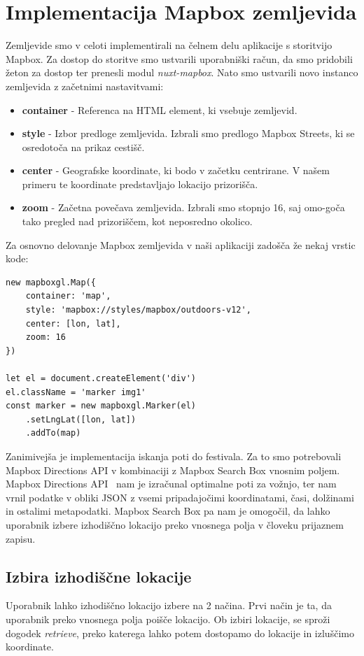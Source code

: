 \documentclass[a4paper,12pt,openright]{book}
\begin{document}
\section{Implementacija Mapbox zemljevida}
Zemljevide smo v celoti implementirali na čelnem delu aplikacije s storitvijo Mapbox.
Za dostop do storitve smo ustvarili uporabniški račun, da smo pridobili žeton za dostop ter prenesli modul \textit{nuxt-mapbox}.
Nato smo ustvarili novo instanco zemljevida z začetnimi nastavitvami:
\begin{itemize}
    \item \textbf{container} - Referenca na HTML element, ki vsebuje zemljevid.
    \item \textbf{style} - Izbor predloge zemljevida. Izbrali smo predlogo Mapbox Streets, ki se osredotoča na prikaz cestišč.
    \item \textbf{center} - Geografske koordinate, ki bodo v začetku centrirane. V našem primeru te koordinate predstavljajo lokacijo prizorišča.
    \item \textbf{zoom} - Začetna povečava zemljevida. Izbrali smo stopnjo 16, saj omo-goča tako pregled nad prizoriščem, kot neposredno okolico.
\end{itemize}

Za osnovno delovanje Mapbox zemljevida v naši aplikaciji zadošča že nekaj vrstic kode:
\begin{lstlisting}[label=code4,caption=Primer kode za prikaz lokacije na Mapbox zemljevidu.,frame=tb,captionpos=b]
new mapboxgl.Map({
    container: 'map',
    style: 'mapbox://styles/mapbox/outdoors-v12',
    center: [lon, lat],
    zoom: 16
})

let el = document.createElement('div')
el.className = 'marker img1'
const marker = new mapboxgl.Marker(el)
    .setLngLat([lon, lat])
    .addTo(map)
\end{lstlisting}

Zanimivejša je implementacija iskanja poti do festivala.
Za to smo potrebovali Mapbox Directions API v kombinaciji z Mapbox Search Box vnosnim poljem.
Mapbox Directions API~\cite{mapboxdirections} nam je izračunal optimalne poti za vožnjo, ter nam vrnil podatke v obliki JSON z vsemi pripadajočimi koordinatami, časi, dolžinami in ostalimi metapodatki.
Mapbox Search Box pa nam je omogočil, da lahko uporabnik izbere izhodiščno lokacijo preko vnosnega polja v človeku prijaznem zapisu.

\subsection{Izbira izhodiščne lokacije}
Uporabnik lahko izhodiščno lokacijo izbere na 2 načina.
Prvi način je ta, da uporabnik preko vnosnega polja poišče lokacijo.
Ob izbiri lokacije, se sproži dogodek \textit{retrieve}, preko katerega lahko potem dostopamo do lokacije in izluščimo koordinate.
\end{document}
